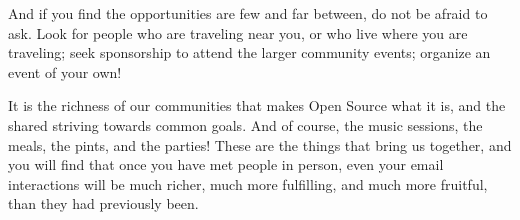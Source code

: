 And if you find the opportunities are few and far between, do not be
afraid to ask. Look for people who are traveling near you, or who
live where you are traveling; seek sponsorship to attend the larger
community events; organize an event of your own!

It is the richness of our communities that makes Open Source what it
is, and the shared striving towards common goals. And of course, the
music sessions, the meals, the pints, and the parties! These are the
things that bring us together, and you will find that once you have met
people in person, even your email interactions will be much richer,
much more fulfilling, and much more fruitful, than they had previously
been.

